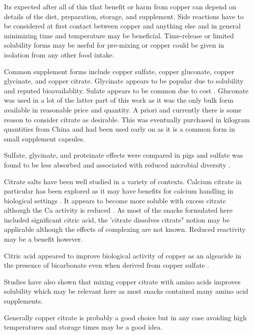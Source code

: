 Its expected after all of this that benefit or harm from
copper can depend on details of the diet, preparation, storage, and
supplement. Side reactions have to be considered at first contact
between copper and anything else and in general minimizing time
and temperature may be beneficial.  Time-release or limited
solubility forms may be useful for pre-mixing or copper could be
given in isolation from any other food intake.

Common supplement forms include copper sulfate, copper gluconate,
copper glycinate, and copper citrate.  Glycinate appears to be popular
due to solubility and reputed bioavailablity. Sulate appears to be
common due to cost \cite{Wu_Tan_Shi_vitro_bioaccessibility_2024}. 
Gluconate was used in a lot of the latter
part of this work as it was the only bulk form available in 
reasonable price and quantity. A priori and currently there is some
reason to consider citrate as desirable. This was eventually
purchased in kilogram quantities from China and had been used
early on as it is a common form in small supplement capsules.

Sulfate, glycinate, and proteinate effects were compared
in pigs and sulfate was found to be less absorbed and associated
with reduced microbial diversity \cite{PMC8718720}. 


Citrate salts have been well studied in a variety of contexts.
Calcium citrate in particular  has been explored as
it may have benefits for calcium handling in 
biological settings 
\cite{Liu_Skibsted_Citrate_calcium_transport_2023}.
It appears to become more soluble
with excess citrate although the Ca activity is reduced
\cite{Vavrusova_Skibsted_Aqueous_solubility_calcium_2016}.
As most of the snacks formulated here included significant
citric acid, the 'citrate dissolves citrate" notion may be
applicable although the effects of complexing are not 
known. Reduced reactivity may be a benefit however.

Citric acid appeared to improve biological activity
of copper as an algeacide in the presence of bicarbonate
even when derived from copper sulfate
\cite{Swader_Chan_Citric_acid_enhancement_1975}.

Studies have also shown that mixing copper citrate
with amino acids improves solubility
\cite{Sobel_Haigney_Kim_complexation_aqueous_}
which may be relevant here as most snacks contained
many amino acid supplements. 


Generally copper citrate is probably a good choice but in any
case avoiding high temperatures and storage times may be a good
idea. 
